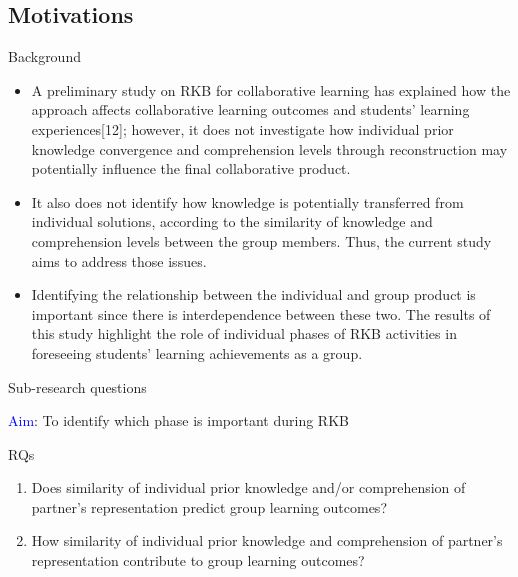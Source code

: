 \subsection{Motivations}
\begin{frame}{Background}

\begin{itemize}
    \item A preliminary study on RKB for collaborative learning has explained how the approach affects collaborative learning outcomes and students’ learning experiences[12]; however, it does not investigate how individual prior knowledge convergence and comprehension levels through reconstruction may potentially influence the final collaborative product.
    \item It also does not identify how knowledge is potentially transferred from individual solutions, according to the similarity of knowledge and comprehension levels between the group members. Thus, the current study aims to address those issues.
    \item Identifying the relationship between the individual and group product is important since there is interdependence between these two. The results of this study highlight the role of individual phases of RKB activities in foreseeing students’ learning achievements as a group.
\end{itemize}
       
\end{frame}

\begin{frame}{Sub-research questions}

\textcolor<1>{blue}{Aim}: To identify which phase is important during RKB

\begin{block}{RQs}
    \begin{enumerate}
        \item Does similarity of individual prior knowledge and/or comprehension 
              of partner's representation predict group learning outcomes?
        \item How similarity of individual prior knowledge and comprehension
              of partner's representation contribute to group learning outcomes?
    \end{enumerate}
\end{block}
    
\end{frame}



